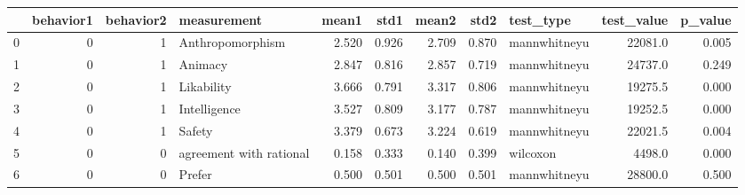 \begin{tabular}{lrrlrrrrlrr}
\toprule
{} &  behavior1 &  behavior2 &              measurement &  mean1 &   std1 &  mean2 &   std2 &     test\_type &  test\_value &  p\_value \\
\midrule
0 &          0 &          1 &         Anthropomorphism &  2.520 &  0.926 &  2.709 &  0.870 &  mannwhitneyu &     22081.0 &    0.005 \\
1 &          0 &          1 &                  Animacy &  2.847 &  0.816 &  2.857 &  0.719 &  mannwhitneyu &     24737.0 &    0.249 \\
2 &          0 &          1 &               Likability &  3.666 &  0.791 &  3.317 &  0.806 &  mannwhitneyu &     19275.5 &    0.000 \\
3 &          0 &          1 &             Intelligence &  3.527 &  0.809 &  3.177 &  0.787 &  mannwhitneyu &     19252.5 &    0.000 \\
4 &          0 &          1 &                   Safety &  3.379 &  0.673 &  3.224 &  0.619 &  mannwhitneyu &     22021.5 &    0.004 \\
5 &          0 &          0 &  agreement with rational &  0.158 &  0.333 &  0.140 &  0.399 &      wilcoxon &      4498.0 &    0.000 \\
6 &          0 &          0 &                   Prefer &  0.500 &  0.501 &  0.500 &  0.501 &  mannwhitneyu &     28800.0 &    0.500 \\
\bottomrule
\end{tabular}
